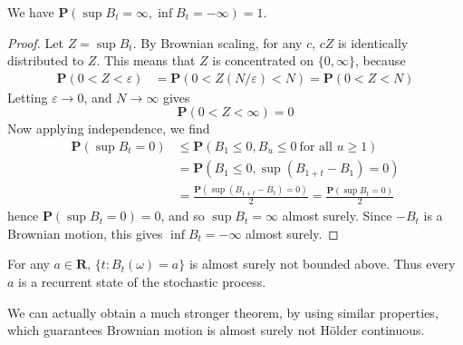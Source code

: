 \begin{lemma}
    We have $\mathbf{P} \left( \sup B_t = \infty, \inf B_t = -\infty \right) = 1$.
\end{lemma}
\begin{proof}
    Let $Z = \sup B_t$. By Brownian scaling, for any $c$, $cZ$ is identically distributed to $Z$. This means that $Z$ is concentrated on $\{ 0, \infty \}$, because
    \begin{align*}
        \mathbf{P}(0 < Z < \varepsilon) &= \mathbf{P}\left(0 < Z(N/\varepsilon) < N \right) = \mathbf{P}(0 < Z < N)
    \end{align*}
    Letting $\varepsilon \to 0$, and $N \to \infty$ gives
    \[ \mathbf{P}(0 < Z < \infty) = 0 \]
    Now applying independence, we find
    \begin{align*}
        \mathbf{P}(\sup B_t = 0) &\leq \mathbf{P}(B_1 \leq 0, B_u \leq 0\ \text{for all $u \geq 1$})\\
        &= \mathbf{P}(B_1 \leq 0, \sup(B_{1 + t} - B_1) = 0)\\
        &= \frac{\mathbf{P}(\sup(B_{1+t} - B_t) = 0)}{2} = \frac{\mathbf{P}(\sup B_t = 0)}{2}
    \end{align*}
    hence $\mathbf{P}(\sup B_t = 0) = 0$, and so $\sup B_t = \infty$ almost surely. Since $-B_t$ is a Brownian motion, this gives $\inf B_t = -\infty$ almost surely.
\end{proof}

\begin{corollary}
    For any $a \in \mathbf{R}$, $\{ t: B_t(\omega) = a \}$ is almost surely not bounded above. Thus every $a$ is a recurrent state of the stochastic process.
\end{corollary}

We can actually obtain a much stronger theorem, by using similar properties, which guarantees Brownian motion is almost surely not H\"{o}lder continuous.

